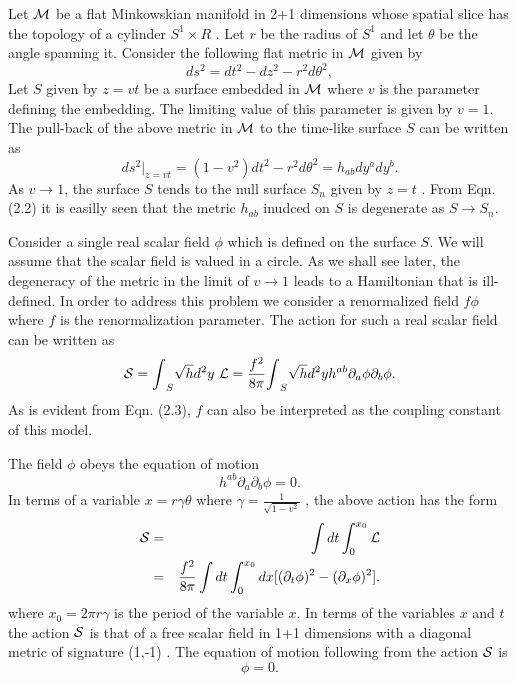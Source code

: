 \documentclass[a4paper,12pt]{article}
\let\oldtheequation=\theequation
\def\doteqs#1{\setcounter{equation}{0}
            \def\theequation{{#1}.\oldtheequation}}
\newcounter{sxn}
\def\sx#1{\addtocounter{sxn}{1} \bigskip\medskip \goodbreak
\noindent{\large\bf
\centerline{\thesxn.~~#1}} \nobreak \medskip}
\def\sxn#1{\sx{#1} \doteqs{\thesxn}}
\begin{document}
\sxn{Scalar Field}

Let ${\cal M}$ be a flat Minkowskian manifold in 2+1 dimensions 
whose spatial slice has the topology of a cylinder $ S^1 {\times} R $ . 
Let $r$ be the radius of $S^1$ and let $\theta$ be the angle spanning it.
Consider the following flat metric in ${\cal M}$ given by
\begin{equation}
ds^{2}=dt^{2}-dz^{2}-r^2d{\theta}^{2},
\end{equation}
Let $S$ given by $z=vt$ be a surface embedded in ${\cal M}$ where $v$ is the
parameter defining the embedding. The limiting value of this parameter is
given by $v = 1$.
The pull-back of the 
 above metric in ${\cal M}$ 
to the time-like surface $S$ can be written as 
\begin{equation}
ds^2|_{z=vt}=(1-v^2)dt^2-r^2d{\theta}^2 = h_{ab}dy^{a}dy^{b}.
\end{equation}
As $v \rightarrow  1$, the surface $S$ tends to 
 the null surface $S_n$ given by $z = t$ .
From Eqn. (2.2) it is easilly seen that
 the  metric $h_{ab}$ inudced on $S$ is degenerate as 
$S \rightarrow S_n$.

Consider a single real scalar field $\phi$ which is defined on the surface 
$S$. We will assume that the scalar field is valued  in a circle.
As we shall see later, the degeneracy of the metric in the limit of 
$v \rightarrow  1$ leads to a Hamiltonian that is ill-defined. In order to
address this problem we consider a renormalized field 
$ f \phi $ where $f$ is the renormalization parameter.
The action for such a real scalar field can be written as 
\begin{equation}
{\cal S}={\int}_S \sqrt{h}d^2y~ {\cal L}=\frac{f^2}{8{\pi}}
{\int}_S \sqrt{h}d^2y h^{ab} {\partial}_a{\phi} {\partial}_b{\phi}.
\end{equation}
As is evident from Eqn. (2.3), $f$ can also be interpreted as the coupling
constant of this model. 

The field $\phi$ obeys the equation of motion  
\begin{equation}
h^{ab}{\partial}_{a}{\partial}_{b}{\phi}=0.
\end{equation}
In terms of a variable $x = r{\gamma}{\theta}$ 
where ${\gamma}=\frac{1}{\sqrt{1 - v^2}}$ , 
the above action has the form
\begin{eqnarray}
{\cal S}&=&\int dt \int_{0}^{x_0} {\cal L}\nonumber\\
&=&\frac{f^2}{8{\pi}}\int dt \int_{0}^{x_0} dx 
[ ({\partial}_{t}{\phi})^2 -({\partial}_{x}{\phi})^2 ].\nonumber\\ 
\end{eqnarray}
where $x_0=2{\pi}r{\gamma}$
is the period of the  variable $x$. 
In terms of the variables $x$ and $t$ the action ${\cal S}$ 
is that of a free scalar field in 1+1 dimensions with a
diagonal metric of signature (1,-1) . 
The equation of motion following from the action ${\cal S}$ is 
\begin{equation}
[({\partial}_{t})^2-({\partial}_{x})^2]{\phi}=0.
\end{equation}
\end{document}
